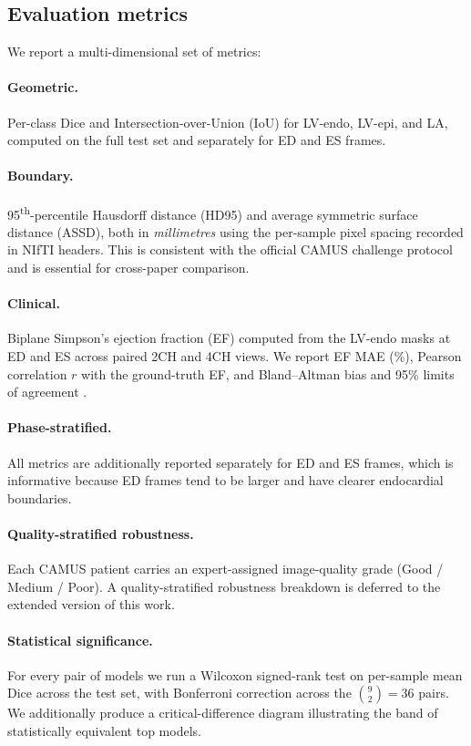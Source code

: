 \subsection{Evaluation metrics}
\label{sec:methods-metrics}

We report a multi-dimensional set of metrics:

\paragraph{Geometric.}
Per-class Dice and Intersection-over-Union (IoU) for LV-endo, LV-epi,
and LA, computed on the full test set and separately for ED and ES
frames.

\paragraph{Boundary.}
95\textsuperscript{th}-percentile Hausdorff distance (HD95) and average
symmetric surface distance (ASSD), both in \emph{millimetres} using the
per-sample pixel spacing recorded in NIfTI headers. This is consistent
with the official CAMUS challenge protocol and is essential for
cross-paper comparison.

\paragraph{Clinical.}
Biplane Simpson's ejection fraction (EF) computed from the LV-endo
masks at ED and ES across paired 2CH and 4CH views. We report
EF MAE (\%), Pearson correlation $r$ with the ground-truth EF, and
Bland--Altman bias and 95\% limits of agreement \citep{bland1986}.

\paragraph{Phase-stratified.}
All metrics are additionally reported separately for ED and ES frames,
which is informative because ED frames tend to be larger and have clearer
endocardial boundaries.

\paragraph{Quality-stratified robustness.}
Each CAMUS patient carries an expert-assigned image-quality grade
(Good / Medium / Poor). A quality-stratified robustness breakdown is
deferred to the extended version of this work.

\paragraph{Statistical significance.}
For every pair of models we run a Wilcoxon signed-rank test on per-sample
mean Dice across the test set, with Bonferroni correction across the
$\binom{9}{2} = 36$ pairs. We additionally produce a critical-difference
diagram \citep{demsar2006} illustrating the band of statistically
equivalent top models.

